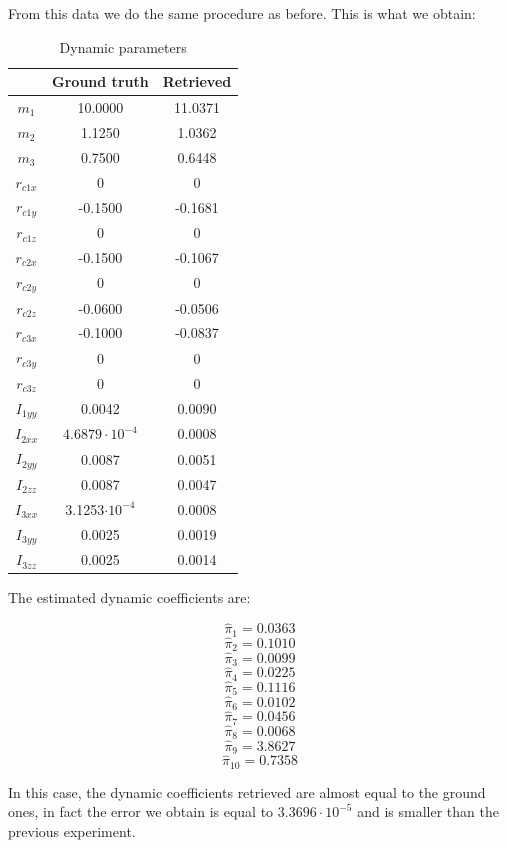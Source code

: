 \documentclass{article}
\begin{document}
From this data we do the same procedure as before. This is what we obtain:

\begin{table}[!htbp]
\centering
\begin{tabular}{|c|cc|}
\hline
& Ground truth & Retrieved\\ 
\hline
$m_1$ & 10.0000 & 11.0371\\
$m_2$ & 1.1250 & 1.0362\\
$m_3$ & 0.7500 & 0.6448\\
$r_{c1x}$ &  0 & 0\\
$r_{c1y}$ & -0.1500 & -0.1681\\
$r_{c1z}$ & 0 & 0\\
$r_{c2x}$ & -0.1500 & -0.1067\\
$r_{c2y}$ & 0 & 0\\
$r_{c2z}$ & -0.0600 & -0.0506\\
$r_{c3x}$ & -0.1000 & -0.0837\\
$r_{c3y}$ & 0 & 0\\
$r_{c3z}$ & 0 & 0\\
$I_{1yy}$ & 0.0042 & 0.0090\\
$I_{2xx}$ & $4.6879\cdot 10^{-4}$ & 0.0008\\
$I_{2yy}$ & 0.0087 & 0.0051\\
$I_{2zz}$ & 0.0087 & 0.0047\\
$I_{3xx}$ & 3.1253$\cdot 10^{-4}$ & 0.0008\\
$I_{3yy}$ & 0.0025 & 0.0019\\
$I_{3zz}$ & 0.0025 & 0.0014\\
\hline
\end{tabular}
\caption{Dynamic parameters}
\end{table}
\FloatBarrier

The estimated dynamic coefficients are:

\[\hat{\pi}_1 = 0.0363\]
\[\hat{\pi}_2  = 0.1010\]
\[\hat{\pi}_3 = 0.0099\]
\[\hat{\pi}_4 = 0.0225\]
\[\hat{\pi}_5 = 0.1116\]
\[\hat{\pi}_6 = 0.0102\]
\[\hat{\pi}_7 = 0.0456\]
\[\hat{\pi}_8 = 0.0068\]
\[\hat{\pi}_9 = 3.8627\]
\[\hat{\pi}_{10} = 0.7358\]

In this case, the dynamic coefficients retrieved are almost equal to the ground ones, in fact the error we obtain is equal to   $3.3696\cdot10^{-5}$ and is smaller than the previous experiment.
\end{document}
